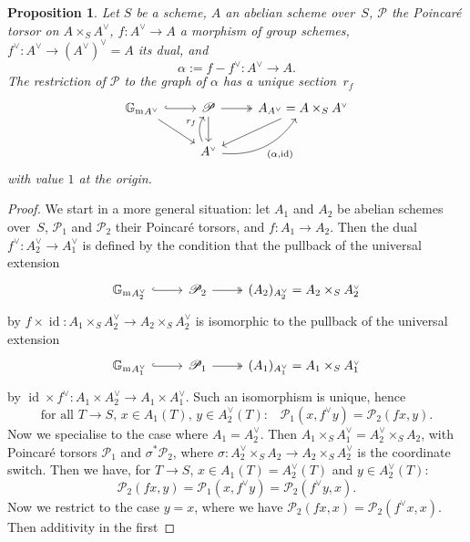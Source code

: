 \documentclass[JEP,XML,SOM,Unicode,NoFloatCountersInSection]{cedram}
\let\mathcal\mathscr
\let\oldvee\vee
\renewcommand{\vee}{{\scriptscriptstyle\oldvee}}
\theoremstyle{plain}
\newtheorem{Proposition}[subsection]{Proposition}
\theoremstyle{definition}
\numberwithin{equation}{subsection}
\renewcommand{\G}{\mathbb G}
\newcommand{\calP}{\mathcal{P}}
\newcommand{\Gm}{\G_{\mathrm{m}}}
\DeclareMathOperator{\id}{id}
\begin{document}
\begin{Proposition}\label{prop:ribsec}
Let $S$ be a scheme, $A$ an abelian scheme over~$S$, $\calP$ the
Poincaré torsor on $A\times_S A^\vee$, $f\colon A^\vee\to A$ a
morphism of group schemes, $f^\vee\colon A^\vee\to (A^\vee)^\vee=A$
its dual, and
\[
\alpha:=f-f^\vee\colon A^\vee\to A.
\]
The restriction of $\calP$ to the graph of $\alpha$ has a unique
section~$r_f$
\[
\begin{tikzcd}
{\Gm}_{A^\vee} \arrow[dr] \arrow[r, hook]
& \calP \arrow[r, two heads] \arrow[d]
& A_{A^\vee} = A\times_SA^\vee \arrow[dl]\\
& A^\vee \arrow[u, bend left, "r_f"]
\arrow[ur, bend right, "{(\alpha,\id)}"'] &
\end{tikzcd}
\]
with value $1$ at the origin.
\end{Proposition}
\begin{proof}
We start in a more general situation: let $A_1$ and $A_2$ be abelian
schemes over~$S$, $\calP_1$ and $\calP_2$ their Poincaré torsors,
and $f\colon\! A_1\!\to\!A_2$. Then the dual \hbox{$f^\vee\colon\! A_2^\vee\!\to\!A_1^\vee$} is defined by the condition that the pullback of the
universal extension
\[
\begin{tikzcd}
{\Gm}_{A_2^\vee} \arrow[r, hook]
& \calP_2 \arrow[r, two heads]
& (A_2)_{A_2^\vee} = A_2\times_SA_2^\vee
\end{tikzcd}
\]
by $f\times \id\colon A_1\times_S A_2^\vee\to A_2\times_S A_2^\vee$ is
isomorphic to the pullback of the universal extension
\[
\begin{tikzcd}
{\Gm}_{A_1^\vee} \arrow[r, hook]
& \calP_1 \arrow[r, two heads]
& (A_1)_{A_1^\vee} = A_1\times_SA_1^\vee
\end{tikzcd}
\]
by $\id\times f^\vee\colon A_1\times A_2^\vee\to A_1\times
A_1^\vee$. Such an isomorphism is unique, hence
\[
\text{for all $T\to S$, $x\in A_1(T)$, $y\in A_2^\vee(T)$:}
\quad \calP_1(x,f^\vee y) = \calP_2(fx,y).
\]
Now we specialise to the case where $A_1=A_2^\vee$. Then
$A_1\times_S A_1^\vee=A_2^\vee\times_S A_2$, with Poincaré torsors
$\calP_1$ and $\sigma^*\calP_2$, where $\sigma\colon
A_2^\vee\times_SA_2\to A_2\times_S A_2^\vee$ is the coordinate switch. Then
we have, for $T\to S$, $x\in A_1(T)=A_2^\vee(T)$ and $y\in A_2^\vee(T)$:
\begin{equation}\label{eq:isombiexts}
\calP_2(fx,y) = \calP_1(x,f^\vee y) = \calP_2(f^\vee y,x).
\end{equation}
Now we restrict to the case $y=x$, where we have
$\calP_2(fx,x)=\calP_2(f^\vee x,x)$. Then additivity in the first

\end{proof}
\end{document}
